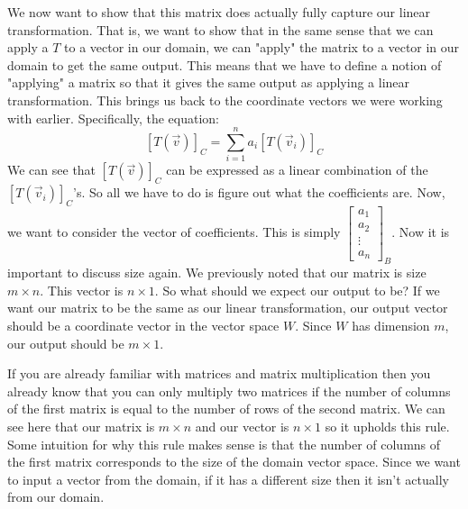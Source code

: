 We now want to show that this matrix does actually fully capture our linear transformation. That is, we want to show that in the same sense that we can apply a $T$ to a vector in our domain, we can "apply" the matrix to a vector in our domain to get the same output. This means that we have to define a notion of "applying" a matrix so that it gives the same output as applying a linear transformation. This brings us back to the coordinate vectors we were working with earlier. Specifically, the equation:
$$[T(\vec{v})]_C=\sum_{i=1}^n a_i[T(\vec{v}_i)]_C$$
We can see that $[T(\vec{v})]_C$ can be expressed as a linear combination of the $[T(\vec{v}_i)]_C$'s. So all we have to do is figure out what the coefficients are. Now, we want to consider the vector of coefficients. This is simply $\left[\begin{smallmatrix}
    a_1 \\ a_2 \\ \vdots \\ a_n
\end{smallmatrix}\right]_B$. Now it is important to discuss size again. We previously noted that our matrix is size $m\times n$. This vector is $n\times 1$. So what should we expect our output to be? If we want our matrix to be the same as our linear transformation, our output vector should be a coordinate vector in the vector space $W$. Since $W$ has dimension $m$, our output should be $m\times 1$.

If you are already familiar with matrices and matrix multiplication then you already know that you can only multiply two matrices if the number of columns of the first matrix is equal to the number of rows of the second matrix. We can see here that our matrix is $m\times n$ and our vector is $n\times 1$ so it upholds this rule. Some intuition for why this rule makes sense is that the number of columns of the first matrix corresponds to the size of the domain vector space. Since we want to input a vector from the domain, if it has a different size then it isn't actually from our domain.

